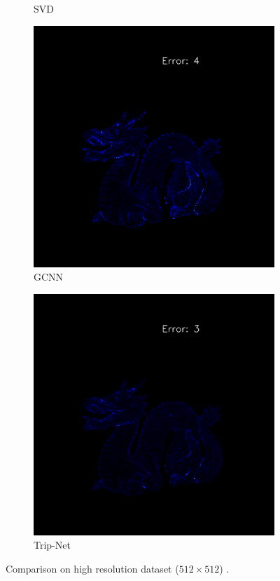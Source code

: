 \begin{figure}[th]
\begin{subfigure}[b]{0.24\linewidth}
		\caption{SVD}
	\end{subfigure}
	\begin{subfigure}[b]{0.24\linewidth}
		\includegraphics[width=\linewidth]{./Figures/comparison_512/fancy_eval_14_error_NNNN-512.png}
		\caption{GCNN}
	\end{subfigure}
	\begin{subfigure}[b]{0.24\linewidth}
		\includegraphics[width=\linewidth]{./Figures/comparison_512/fancy_eval_14_error_Trip-Net-512.png}
		\caption{Trip-Net}
	\end{subfigure}
	\decoRule
	\caption{Comparison on high resolution dataset ($ 512\times 512 $) .}
	\label{fig:trip-eval-compare}
\end{figure}


